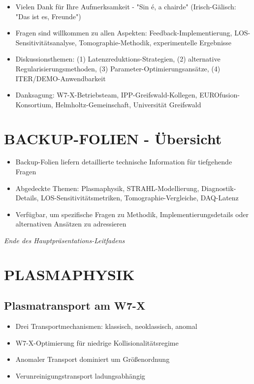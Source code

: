 \documentclass[11pt,a4paper]{article}
\begin{document}
\begin{itemize}
\item Vielen Dank für Ihre Aufmerksamkeit - "Sin é, a chairde" (Irisch-Gälisch: "Das ist es, Freunde")
\item Fragen sind willkommen zu allen Aspekten: Feedback-Implementierung, LOS-Sensitivitätsanalyse, Tomographie-Methodik, experimentelle Ergebnisse
\item Diskussionsthemen: (1) Latenzreduktions-Strategien, (2) alternative Regularisierungsmethoden, (3) Parameter-Optimierungsansätze, (4) ITER/DEMO-Anwendbarkeit
\item Danksagung: W7-X-Betriebsteam, IPP-Greifswald-Kollegen, EUROfusion-Konsortium, Helmholtz-Gemeinschaft, Universität Greifswald
\end{itemize}

\section{BACKUP-FOLIEN - Übersicht}

\begin{itemize}
\item Backup-Folien liefern detaillierte technische Information für tiefgehende Fragen
\item Abgedeckte Themen: Plasmaphysik, STRAHL-Modellierung, Diagnostik-Details, LOS-Sensitivitätsmetriken, Tomographie-Vergleiche, DAQ-Latenz
\item Verfügbar, um spezifische Fragen zu Methodik, Implementierungsdetails oder alternativen Ansätzen zu adressieren
\end{itemize}

\vspace{1em}
\noindent\textit{Ende des Hauptpräsentations-Leitfadens}

\section{PLASMAPHYSIK}

\subsection{Plasmatransport am W7-X}

\begin{itemize}
\item Drei Transportmechanismen: klassisch, neoklassisch, anomal
\item W7-X-Optimierung für niedrige Kollisionalitätsregime
\item Anomaler Transport dominiert um Größenordnung
\item Verunreinigungstransport ladungsabhängig
\end{itemize}
\end{document}
